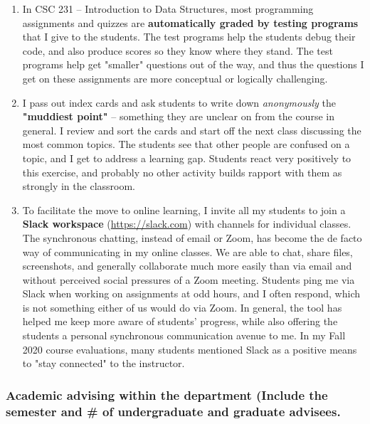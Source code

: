 \documentclass[10pt]{article}
\begin{document}
\begin{enumerate}
    \item In CSC 231 -- Introduction to Data Structures, most programming assignments and quizzes are \textbf{automatically graded by testing programs} that I give to the students. The test programs help the students debug their code, and also produce scores so they know where they stand. The test programs help get "smaller" questions out of the way, and thus the questions I get on these assignments are more conceptual or logically challenging.
    \item I pass out index cards and ask students to write down \textit{anonymously} the \textbf{"muddiest point"} -- something they are unclear on from the course in general. I review and sort the cards and start off the next class discussing the most common topics. The students see that other people are confused on a topic, and I get to address a learning gap. Students react very positively to this exercise, and probably no other activity builds rapport with them as strongly in the classroom.
    \item To facilitate the move to online learning, I invite all my students to join a \textbf{Slack workspace} (\href{https://slack.com}{https://slack.com}) with channels for individual classes. The synchronous chatting, instead of email or Zoom, has become the de facto way of communicating in my online classes. We are able to chat, share files, screenshots, and generally collaborate much more easily than via email and without perceived social pressures of a Zoom meeting. Students ping me via Slack when working on assignments at odd hours, and I often respond, which is not something either of us would do via Zoom. In general, the tool has helped me keep more aware of students' progress, while also offering the students a personal synchronous communication avenue to me. In my Fall 2020 course evaluations, many students mentioned Slack as a positive means to "stay connected" to the instructor.
\end{enumerate}


\subsubsection{Academic advising within the department (Include the semester and \# of undergraduate and graduate advisees.}
\end{document}
